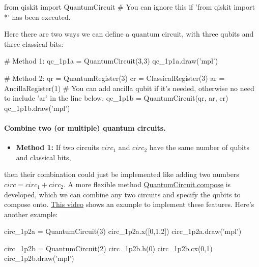 \documentclass[%
oneside,                 %
final,                   %
10pt]{article}
\begin{document}
\bpycod
from qiskit import QuantumCircuit  # You can ignore this if 'from qiskit import *' has been executed.

\epycod


Here there are  two ways we can define a quantum circuit, with three qubits and three classical bits:





\bpycod
# Method 1: 
qc_1p1a = QuantumCircuit(3,3)  
qc_1p1a.draw('mpl')

\epycod









\bpycod
# Method 2: 
qr = QuantumRegister(3)
cr = ClassicalRegister(3)
ar = AncillaRegister(1)  # You can add ancilla qubit if it's needed, otherwise no need to include 'ar' in the line below.
qc_1p1b = QuantumCircuit(qr, ar, cr)
qc_1p1b.draw('mpl')

\epycod


\paragraph{Combine two (or multiple) quantum circuits.}
\begin{itemize}
\item \textbf{Method 1:} If two circuits $circ_1$ and $circ_2$ have the same number of qubits and classical bits,
\end{itemize}

\noindent
then their combination could just be implemented like adding two numbers $circ = circ_1 + circ_2$. A more flexible method
\href{{https://qiskit.org/documentation/stubs/qiskit.circuit.QuantumCircuit.compose.html#qiskit.circuit.QuantumCircuit.compose}}{QuantumCircuit.compose}
is developed, which we can combine any two circuits and specify the qubits to compose onto. \href{{https://www.youtube.com/watch?v=3ja8uCqUS0s}}{This video} shows an example to implement these features. Here's another example:





\bpycod
circ_1p2a = QuantumCircuit(3)
circ_1p2a.x([0,1,2])
circ_1p2a.draw('mpl')

\epycod







\bpycod
circ_1p2b = QuantumCircuit(2)
circ_1p2b.h(0)
circ_1p2b.cx(0,1)
circ_1p2b.draw('mpl')
\end{document}

